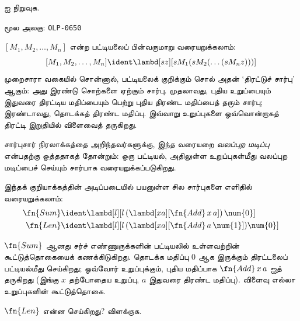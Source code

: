 \documentclass[11pt,a4paper,openany]{memoir}
\begin{document}
\begin{prob}
   ஐ நிறுவுக.
\end{prob}



\clearpage
\noindent மூல அலகு: \texttt{OLP-0650}\par





$[M_1, M_2, \ldots, M_n]$ என்ற பட்டியலைப் பின்வருமாறு வரையறுக்கலாம்:
\[
  [M_1, M_2, \ldots, M_n] \ident \lambd[sz][s M_1 (s M_2 (\ldots (s M_n z)))]
\]
முறைசாரா வகையில் சொன்னால், பட்டியலைக் குறிக்கும் சொல் அதன்
‘திரட்டுச் சார்பு’ ஆகும்: அது இரண்டு சொற்களை ஏற்கும் சார்பு.
முதலாவது, புதிய உறுப்பையும் இதுவரை திரட்டிய மதிப்பையும் பெற்று
புதிய திரண்ட மதிப்பைத் தரும் சார்பு; இரண்டாவது, தொடக்கத் திரண்ட
மதிப்பு. இவ்வாறு உறுப்புகளை ஒவ்வொன்றாகத் திரட்டி இறுதியில்
விளைவைத் தருகிறது.

\begin{digress}
  சார்புசார் நிரலாக்கத்தை அறிந்தவர்களுக்கு, இந்த வரையறை
  \emph{வலப்புற மடிப்பு} என்பதற்கு ஒத்ததாகத் தோன்றும்:
  ஒரு பட்டியல், அதிலுள்ள உறுப்புகள்மீது வலப்புற மடிப்பைச் செய்யும்
  சார்பாக வரையறுக்கப்படுகிறது.
\end{digress}

இந்தக் குறியாக்கத்தின் அடிப்படையில் பயனுள்ள சில சார்புகளை எளிதில்
வரையறுக்கலாம்:
\begin{align*}
  \fn{Sum} & \ident
  \lambd[l][l \, (\lambd[xa][\fn{Add} \, x \, a])\,  \num{0}]\\
  \fn{Len} & \ident
  \lambd[l][l \, (\lambd[xa][\fn{Add} \, a \, \num{1}]) \num{0}]
\end{align*}

$\fn{Sum}$ ஆனது சர்ச் எண்ணுருக்களின் பட்டியலில் உள்ளவற்றின்
கூட்டுத்தொகையைக் கணக்கிடுகிறது. தொடக்க மதிப்பு $\num{0}$
ஆக இருக்கும் திரட்டலைப் பட்டியல்மீது செய்கிறது; ஒவ்வோர் உறுப்புக்கும்,
புதிய மதிப்பாக $\fn{Add} \, x\, a$ ஐத் தருகிறது
(இங்கு $x$ தற்போதைய உறுப்பு, $a$ இதுவரை திரண்ட மதிப்பு).
விளைவு எல்லா உறுப்புகளின் கூட்டுத்தொகை.

\begin{prob}
  $\fn{Len}$ என்ன செய்கிறது? விளக்குக.
\end{prob}
\end{document}
